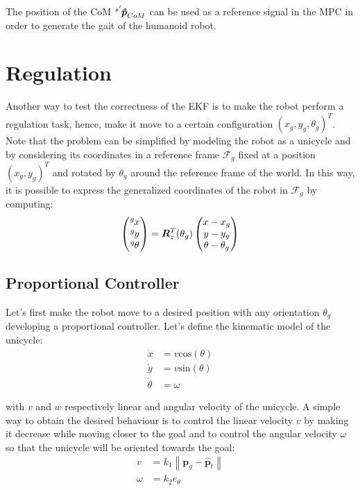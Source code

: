 \documentclass[a4paper]{article}
\begin{document}
The position of the CoM $\tensor[^{s'}]{\bm{\hat{p}}}{_{CoM}}$ can be
used as a reference signal in the MPC in order to generate the gait
of the humanoid robot.

\section{Regulation}
Another way to test the correctness of the EKF is to make the robot perform
a regulation task, hence, make it move to a certain configuration
$(x_g, y_g, \theta_g)^T$. Note that the problem can be simplified by
modeling the robot as a unicycle and by considering its coordinates
in a reference frame $\mathcal{F}_g$ fixed at a position $(x_g, y_g)^T$ and
rotated by $\theta_g$ around the reference frame of the world. In this way, it is
possible to express the generalized coordinates of the robot in $\mathcal{F}_g$
by computing:
\begin{equation}
    \begin{pmatrix}
        \tensor[^g]{x}{} \\
        \tensor[^g]{y}{} \\
        \tensor[^g]{\theta}{}
    \end{pmatrix}
        =
    \bm{R}_z^T(\theta_g)
    \begin{pmatrix}
        x - x_g \\
        y - y_g \\
        \theta - \theta_g
    \end{pmatrix}
\end{equation}

\subsection{Proportional Controller}
\label{subsec:proportional_controller}
Let's first make the robot move to a desired position with any orientation
$\theta_g$ developing a proportional controller.
Let's define the kinematic model of the unicycle:
\begin{align}
    \label{eq:kinematic-model-unicycle-xdot}
    \dot{x} &= v \text{cos}(\theta) \\
    \label{eq:kinematic-model-unicycle-ydot}
    \dot{y} &= v \text{sin}(\theta) \\
    \label{eq:kinematic-model-unicycle-thetadot}
    \dot{\theta} &= \omega
\end{align}

\noindent with $v$ and $w$ respectively linear and angular velocity of the
unicycle. A simple way to obtain the desired behaviour is to control the
linear velocity $v$ by making it decrease while moving closer to the goal and to
control the
angular velocity $\omega$ so that the unicycle
will be oriented towards the goal:
\begin{align}
    \label{eq:proportional-controller-control-law-v}
    v &= k_1 \left\| \bm{p}_g - \bm{\hat{p}}_t \right\| \\
    \label{eq:proportional-controller-control-law-w}
    \omega &= k_2 e_{\theta}
\end{align}
\end{document}
